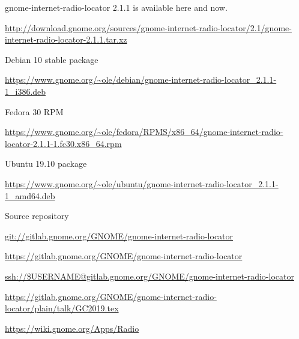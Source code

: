 \documentclass[20pt,landscape]{foils}
\begin{document}
\begin{list1}
\item gnome-internet-radio-locator 2.1.1 is available here and now.
  \begin{list2}
  \item \begin{tiny}\url{http://download.gnome.org/sources/gnome-internet-radio-locator/2.1/gnome-internet-radio-locator-2.1.1.tar.xz}\end{tiny}
  \end{list2}
\item Debian 10 stable package
  \begin{list2}
  \item \begin{tiny}\url{https://www.gnome.org/~ole/debian/gnome-internet-radio-locator_2.1.1-1_i386.deb}\end{tiny}
  \end{list2}
\item Fedora 30 RPM
  \begin{list2}
  \item \begin{tiny}\url{https://www.gnome.org/~ole/fedora/RPMS/x86_64/gnome-internet-radio-locator-2.1.1-1.fc30.x86_64.rpm}\end{tiny}
  \end{list2}
\item Ubuntu 19.10 package
  \begin{list2}
  \item \begin{tiny}\url{https://www.gnome.org/~ole/ubuntu/gnome-internet-radio-locator_2.1.1-1_amd64.deb}\end{tiny}
  \end{list2}
\item Source repository
  \begin{list2}
    \item \url{git://gitlab.gnome.org/GNOME/gnome-internet-radio-locator}
    \item \url{https://gitlab.gnome.org/GNOME/gnome-internet-radio-locator}
    \item \url{ssh://$USERNAME@gitlab.gnome.org/GNOME/gnome-internet-radio-locator}
  \end{list2}
\end{list1}


\url{https://gitlab.gnome.org/GNOME/gnome-internet-radio-locator/plain/talk/GC2019.tex}


\url{https://wiki.gnome.org/Apps/Radio}
\end{document}
